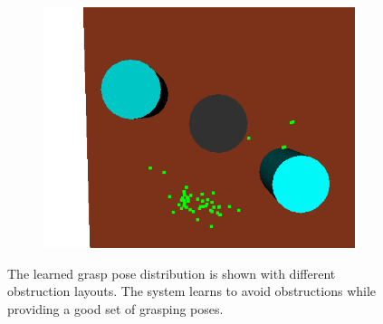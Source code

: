 \begin{figure}
\begin{subfigure}[b]{0.3\linewidth}
    \caption{}
  \end{subfigure}
  \begin{subfigure}[b]{0.3\linewidth}
    \includegraphics[width=\textwidth]{images/finalgraspobstr2.png}
    \caption{}
  \end{subfigure}
  \caption{The learned grasp pose distribution
is shown with different obstruction layouts. The system learns to
avoid obstructions while providing a good set of grasping poses.}
  \label{fig:obstr}
\end{figure}

